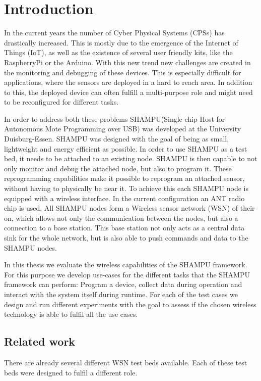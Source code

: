 \chapter{Introduction}
\label{sec:intro}
In the current years the number of Cyber Physical Systems (CPSs) has drastically increased. This is mostly due to the emergence of the Internet of Things (IoT), as well as the existence of several user friendly kits, like the RaspberryPi or the Arduino. With this new trend new challenges are created in the monitoring and debugging of these devices. This is especially difficult for applications, where the sensors are deployed in a hard to reach area. In addition to this, the deployed device can often fulfill a multi-purpose role and might need to be reconfigured for different tasks.

In order to address both these problems SHAMPU(Single chip Host for Autonomous Mote Programming over USB)\cite{Smeets:2014:DAL:2602339.2602401} was developed at the University Duisburg-Essen. SHAMPU was designed with the goal of being as small, lightweight and energy efficient as possible. In order to use SHAMPU as a test bed, it needs to be attached to an existing node. SHAMPU is then capable to not only monitor and debug the attached node, but also to program it. These reprogramming capabilities make it possible to reprogram an attached sensor, without having to physically be near it. To achieve this each SHAMPU node is equipped with a wireless interface. In the current configuration an ANT\cite{DynastreamInnovationsInc.2013} radio chip is used. All SHAMPU nodes form a Wireless sensor network (WSN) of their on, which allows not only the communication between the nodes, but also a connection to a base station. This base station not only acts as a central data sink for the whole network, but is also able to push commands and data to the SHAMPU nodes.

In this thesis we evaluate the wireless capabilities of the SHAMPU framework. For this purpose we develop use-cases for the different tasks that the SHAMPU framework can perform: Program a device, collect data during operation and interact with the system itself during runtime. For each of the test cases we design and run different experiments with the goal to assess if the chosen wireless technology is able to fulfil all the use cases.

\section{Related work}
\label{sec:related_work}
There are already several different WSN test beds available. Each of these test beds were designed to fulfil a different role. 

